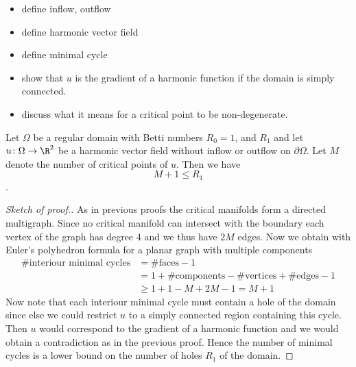\begin{itemize}
  \item define inflow, outflow
  \item define harmonic vector field
  \item define minimal cycle 
  \item show that $u$ is the gradient of a harmonic function if the domain is simply connected.
  \item discuss what it means for a critical point to be non-degenerate.
\end{itemize}

\begin{proposition}
  Let $\Omega$ be a regular domain with Betti numbers $R_0=1$, and $R_1$ and let $u\colon\Omega\to\R^2$ be 
  a harmonic vector field without inflow or outflow on $\partial\Omega$. Let $M$ denote the number of critical points of $u$.
  Then we have $$M+1\leq R_1$$.
\end{proposition}
\begin{proof}[Sketch of proof.]
  As in previous proofs the critical manifolds form a directed multigraph. Since no critical manifold can intersect with the boundary each vertex
  of the graph has degree 4 and we thus have $2M$ edges. Now we obtain with Euler's polyhedron formula
  for a planar graph with multiple components
  \begin{align*}
    \text{\# interiour minimal cycles}
    &= \text{\#faces}-1 \\
    &= 1+\text{\#components}-\text{\#vertices}+\text{\#edges} -1 \\
    &\geq 1+1-M+2M -1 = M+1
  \end{align*}
  Now note that each interiour minimal cycle must contain a hole of the domain since else we could restrict $u$ to a simply
  connected region containing this cycle. Then $u$ would correspond to the gradient of 
  a harmonic function and we would obtain a contradiction as in the previous proof.
  Hence the number of minimal cycles is a lower bound on the number of holes $R_1$ of the domain.
\end{proof}

